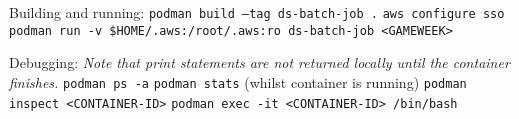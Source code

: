 Building and running:\newline
\texttt{podman build --tag ds-batch-job .}\newline
\texttt{aws configure sso}\newline
\texttt{podman run  -v \$HOME/.aws:/root/.aws:ro ds-batch-job <GAMEWEEK>}

Debugging:\newline
\textit{Note that print statements are not returned locally until the container finishes.}\newline
\texttt{podman ps -a}\newline
\texttt{podman stats} (whilst container is running)\newline
\texttt{podman inspect <CONTAINER-ID>}\newline
\texttt{podman exec -it <CONTAINER-ID> /bin/bash}\newline

\newpage